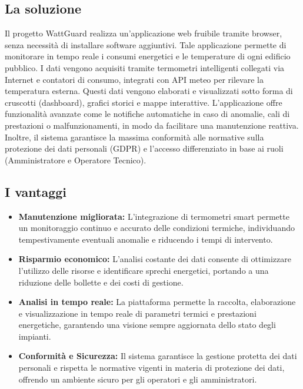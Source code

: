 \subsection{La soluzione}
Il progetto WattGuard realizza un'applicazione web fruibile tramite browser, senza necessità di installare software aggiuntivi. Tale applicazione permette di monitorare in tempo reale i consumi energetici e le temperature di ogni edificio pubblico. \newline
I dati vengono acquisiti tramite termometri intelligenti collegati via Internet e contatori di consumo, integrati con API meteo per rilevare la temperatura esterna. Questi dati vengono elaborati e visualizzati sotto forma di cruscotti (dashboard), grafici storici e mappe interattive. \newline
L'applicazione offre funzionalità avanzate come le notifiche automatiche in caso di anomalie, cali di prestazioni o malfunzionamenti, in modo da facilitare una manutenzione reattiva. Inoltre, il sistema garantisce la massima conformità alle normative sulla protezione dei dati personali (GDPR) e l'accesso differenziato in base ai ruoli (Amministratore e Operatore Tecnico).

\subsection{I vantaggi}
\begin{itemize}
    \item \textbf{Manutenzione migliorata:} L'integrazione di termometri smart permette un monitoraggio continuo e accurato delle condizioni termiche, individuando tempestivamente eventuali anomalie e riducendo i tempi di intervento.
    \item \textbf{Risparmio economico:} L'analisi costante dei dati consente di ottimizzare l'utilizzo delle risorse e identificare sprechi energetici, portando a una riduzione delle bollette e dei costi di gestione.
    \item \textbf{Analisi in tempo reale:} La piattaforma permette la raccolta, elaborazione e visualizzazione in tempo reale di parametri termici e prestazioni energetiche, garantendo una visione sempre aggiornata dello stato degli impianti.
    \item \textbf{Conformità e Sicurezza:} Il sistema garantisce la gestione protetta dei dati personali e rispetta le normative vigenti in materia di protezione dei dati, offrendo un ambiente sicuro per gli operatori e gli amministratori.
\end{itemize}


